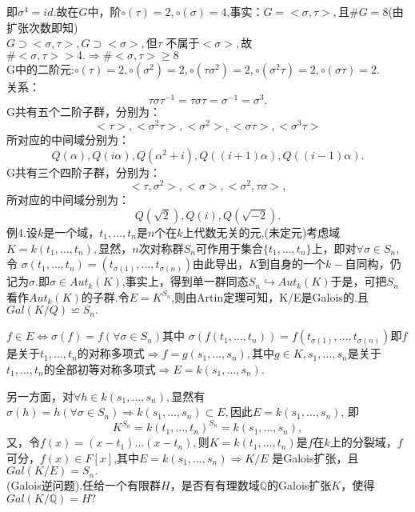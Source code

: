 \documentclass[UTF8]{article}
\begin{document}
即$\sigma^4=id.$故在$G$中，阶$\circ(\tau)=2,\circ(\sigma)=4$,事实：$G=<\sigma,\tau>,$且$\#G=8$(由扩张次数即知)\\
$G\supset<\sigma,\tau>,G\supset<\sigma>,$但$\tau$ 不属于$<\sigma>,$故
$\#<\sigma,\tau>>4.\Rightarrow\#<\sigma,\tau>\geqslant 8$\\
G中的二阶元:$\circ(\tau)=2,\circ(\sigma^2)=2,\circ(\tau\sigma^2)=2,\circ(\sigma^2\tau)=2,\circ(\sigma\tau)=2.$\\
关系：
$$\tau\sigma\tau^{-1}=\tau\sigma\tau=\sigma^{-1}=\sigma^3.$$
G共有五个二阶子群，分别为：
$$<\tau>,<\sigma^2\tau>,<\sigma^2>,<\sigma\tau>,<\sigma^3\tau>$$所对应的中间域分别为：
$$Q(\alpha),Q(i\alpha),Q(\alpha^2+i),Q((i+1)\alpha),Q((i-1)\alpha).$$
G共有三个四阶子群，分别为：
$$<\tau,\sigma^2>,<\sigma>,<\sigma^2,\tau\sigma>,$$所对应的中间域分别为：
$$Q(\sqrt{2}),Q(i),Q(\sqrt{-2}).$$
例4.设$k$是一个域，$t_1,\ldots,t_n$是$n$个在$k$上代数无关的元,(未定元)考虑域$K=k(t_1,\ldots,t_n),$显然，$n$次对称群$S_n$可作用于集合$\{t_1,\ldots,t_n\}$上，即对$\forall\sigma\in S_n,$令
$\sigma(t_1,\ldots,t_n)=(t_{\sigma(1)},\ldots,t_{\sigma(n)})$由此导出，$K$到自身的一个$k-$自同构，仍记为$\sigma.$即$\sigma\in Aut_k(K)$,事实上，得到单一群同态$S_n\hookrightarrow Aut_k(K)$于是，可把$S_n$ 看作$Aut_k(K)$的子群.令$E=K^{S_n}$,则由Artin定理可知，K/E是Galois的.且$Gal(K/Q)\backsimeq S_n.$


$f\in E\Leftrightarrow \sigma(f)=f(\forall\sigma\in S_n)$其中
$\sigma(f(t_1,\ldots,t_n))=f(t_{\sigma(1)},\ldots,t_{\sigma(n)})$即$f$是关于$t_1,\ldots,t_n$的对称多项式$\Rightarrow f=g(s_1,\ldots,s_n),$其中$g\in K,s_1,\ldots,s_n$是关于$t_1,\ldots,t_n$的全部初等对称多项式$\Rightarrow E=k(s_1,\ldots,s_n).$


另一方面，对$\forall h\in k(s_1,\ldots,s_n),$显然有$\sigma(h)=h(\forall\sigma\in S_n)\Rightarrow k(s_1,\ldots,s_n)\subset E,$因此$E=k(s_1,\ldots,s_n)$,
即
$$K^{S_n}=k(t_1,\ldots,t_n)^{S_n}=k(s_1,\ldots,s_n),$$
又，令$f(x)=(x-t_1)\ldots(x-t_n),$则$K=k(t_1,\ldots,t_n)$是$f$在$k$上的分裂域，$f$可分，$f(x)\in F[x]$,其中$E=k(s_1,\ldots,s_n)\Rightarrow K/E$ 是Galois扩张，且$Gal(K/E)=S_n.$\\
(Galois逆问题).任给一个有限群$H$，是否有有理数域$\mathbb{Q}$的Galois扩张$K$，使得$Gal(K/\mathbb{Q})=H?$\\
\end{document}
